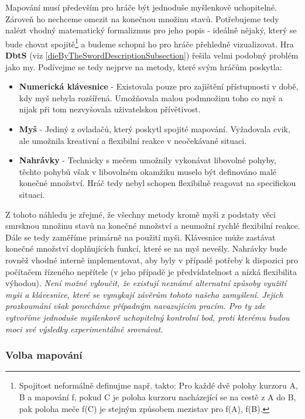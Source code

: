 Mapování musí především pro hráče být jednoduše myšlenkově uchopitelné. Zároveň ho nechceme omezit na konečnou množinu stavů. Potřebujeme tedy nalézt vhodný matematický formalizmus pro jeho popis - ideálně nějaký, který se bude chovat spojitě\footnote{Spojitost neformálně definujme např. takto: Pro každé dvě polohy kurzoru A, B a mapování f, pokud C je poloha kurzoru nacházející se na cestě z A do B, pak poloha meče f(C) je stejným způsobem mezistav pro f(A), f(B).} a budeme schopni ho pro hráče přehledně vizualizovat. 
\bigbreak
Hra \textbf{\acl{DbtS}} (viz \ref{dieByTheSwordDescriptionSubsection}) řešila velmi podobný problém jako my. Podívejme se tedy nejprve na metody, které svým hráčům poskytla:
\begin{itemize}
    \item \textbf{Numerická klávesnice} - Existovala pouze pro zajištění přístupnosti v době, kdy myš nebyla rozšířená. Umožňovala malou podmnožinu toho co myš a nijak při tom nezvyšovala uživatelskou přívětivost.
    \item \textbf{Myš} - Jediný z ovladačů, který poskytl spojité mapování. Vyžadovala cvik, ale umožnila kreativní a flexibilní reakce v neočekávané situaci.
    \item \textbf{Nahrávky} - Technicky s mečem umožnily vykonávat libovolné pohyby, těchto pohybů však v libovolném okamžiku muselo být definováno malé konečné množství. Hráč tedy nebyl schopen flexibilně reagovat na specifickou situaci. 
\end{itemize}
Z tohoto náhledu je zřejmé, že všechny metody kromě myši z podstaty věci smrsknou množinu stavů na konečné množství a neumožní rychlé flexibilní reakce. Dále se tedy zaměříme primárně na použití myši. Klávesnice může zastávat konečné množství doplňujících funkcí, které se na myš nevešly. Nahrávky bude rovněž vhodné interně implementovat, aby byly v případě potřeby k dispozici pro počítačem řízeného nepřítele (v jeho případě je předvídatelnost a nízká flexibilita výhodou).
\bigbreak
\textit{Není možné vyloučit, že existují neznámé alternatní způsoby využití myši a klávesnice, které se vymykají závěrům tohoto našeho zamyšlení. Jejich prozkoumání však ponecháme případným navazujícím pracím. Pro ty zde vytvoříme jednoduše myšlenkově uchopitelný kontrolní bod, proti kterému budou moci své výsledky experimentálně srovnávat.}

\subsubsection*{Volba mapování}


